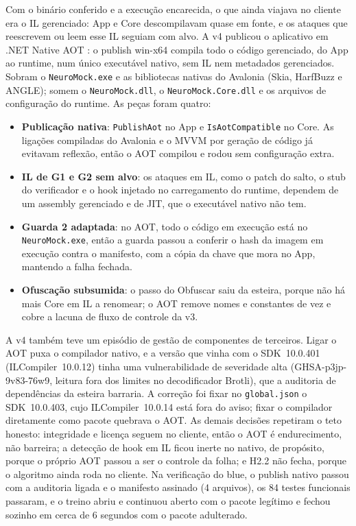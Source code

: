 Com o binário conferido e a execução encarecida, o que ainda viajava no cliente era o IL gerenciado: App e Core descompilavam quase em fonte, e os ataques que reescrevem ou leem esse IL seguiam com alvo. A v4 publicou o aplicativo em .NET Native AOT \parencite{nativeaot}: o publish win-x64 compila todo o código gerenciado, do App ao runtime, num único executável nativo, sem IL nem metadados gerenciados. Sobram o \texttt{NeuroMock.exe} e as bibliotecas nativas do Avalonia (Skia, HarfBuzz e ANGLE); somem o \texttt{NeuroMock.dll}, o \texttt{NeuroMock.Core.dll} e os arquivos de configuração do runtime. As peças foram quatro:
\begin{itemize}
\item \textbf{Publicação nativa}: \texttt{PublishAot} no App e \texttt{IsAotCompatible} no Core. As ligações compiladas do Avalonia e o MVVM por geração de código já evitavam reflexão, então o AOT compilou e rodou sem configuração extra.
\item \textbf{IL de G1 e G2 sem alvo}: os ataques em IL, como o patch do salto, o stub do verificador e o hook injetado no carregamento do runtime, dependem de um assembly gerenciado e de JIT, que o executável nativo não tem.
\item \textbf{Guarda 2 adaptada}: no AOT, todo o código em execução está no \texttt{NeuroMock.exe}, então a guarda passou a conferir o hash da imagem em execução contra o manifesto, com a cópia da chave que mora no App, mantendo a falha fechada.
\item \textbf{Ofuscação subsumida}: o passo do Obfuscar saiu da esteira, porque não há mais Core em IL a renomear; o AOT remove nomes e constantes de vez e cobre a lacuna de fluxo de controle da v3.
\end{itemize}

A v4 também teve um episódio de gestão de componentes de terceiros. Ligar o AOT puxa o compilador nativo, e a versão que vinha com o SDK~10.0.401 (ILCompiler~10.0.12) tinha uma vulnerabilidade de severidade alta (GHSA-p3jp-9v83-76w9, leitura fora dos limites no decodificador Brotli), que a auditoria de dependências da esteira barraria. A correção foi fixar no \texttt{global.json} o SDK~10.0.403, cujo ILCompiler~10.0.14 está fora do aviso; fixar o compilador diretamente como pacote quebrava o AOT. As demais decisões repetiram o teto honesto: integridade e licença seguem no cliente, então o AOT é endurecimento, não barreira; a detecção de hook em IL ficou inerte no nativo, de propósito, porque o próprio AOT passou a ser o controle da folha; e H2.2 não fecha, porque o algoritmo ainda roda no cliente. Na verificação do blue, o publish nativo passou com a auditoria ligada e o manifesto assinado (4 arquivos), os 84 testes funcionais passaram, e o treino abriu e continuou aberto com o pacote legítimo e fechou sozinho em cerca de 6 segundos com o pacote adulterado.

